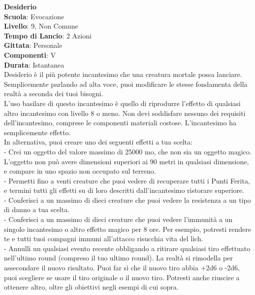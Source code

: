 \begin{multicols}{2}
\medskip\textbf{Desiderio}\\
\textbf{Scuola}: Evocazione\\
\textbf{Livello}: 9, Non Comune\\
\textbf{Tempo di Lancio}: 2 Azioni\\
\textbf{Gittata}: Personale\\
\textbf{Componenti}: V\\
\textbf{Durata}: Istantanea\\
Desiderio è il più potente incantesimo che una creatura mortale possa lanciare. Semplicemente parlando ad alta voce, puoi modificare le stesse fondamenta della realtà a seconda dei tuoi bisogni. \\
L'uso basilare di questo incantesimo è quello di riprodurre l'effetto di qualsiasi altro incantesimo con livello 8 o meno. Non devi soddisfare nessuno dei requisiti dell'incantesimo, comprese le componenti materiali costose. L'incantesimo ha semplicemente effetto.\\
In alternativa, puoi creare uno dei seguenti effetti a tua scelta:\\
- Crei un oggetto del valore massimo di 25000 mo, che non sia un oggetto magico. L'oggetto non può avere dimensioni superiori ai 90 metri in qualsiasi dimensione, e compare in uno spazio non occupato sul terreno.\\
- Permetti fino a venti creature che puoi vedere di recuperare tutti i Punti Ferita, e termini tutti gli effetti su di loro descritti dall'incantesimo ristorare superiore.\\
- Conferisci a un massimo di dieci creature che puoi vedere la resistenza a un tipo di danno a tua scelta.\\
- Conferisci a un massimo di dieci creature che puoi vedere l'immunità a un singolo incantesimo o altro effetto magico per 8 ore. Per esempio, potresti rendere te e tutti tuoi compagni immuni all'attacco risucchia vita del lich.\\
- Annulli un qualsiasi evento recente obbligando a ritirare qualsiasi tiro effettuato nell'ultimo round (compreso il tuo ultimo round). La realtà si rimodella per assecondare il nuovo risultato. Puoi far sì che il nuovo tiro abbia +2d6 o -2d6, puoi scegliere se usare il tiro originale o il nuovo tiro. Potresti anche riuscire a ottenere altro, oltre gli obiettivi negli esempi di cui sopra.\\


\end{multicols}
